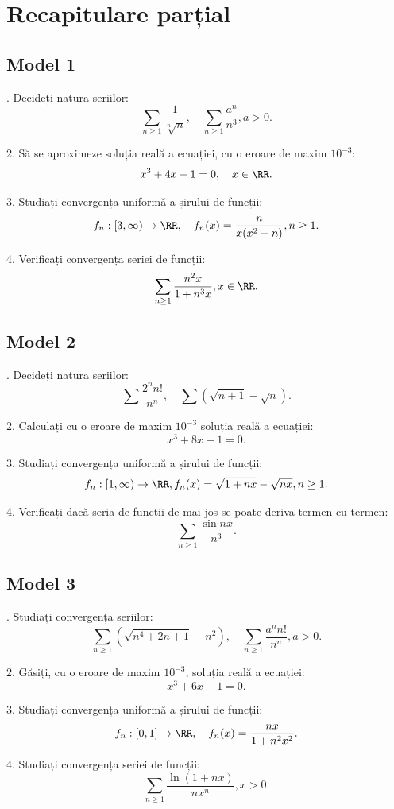 \chapter{Recapitulare parțial}


\section{Model 1}

\indent{}. Decideți natura seriilor:
\[
  \sum_{n \geq 1} \frac{1}{\sqrt[n]{n}}, \quad %
  \sum_{n \geq 1} \frac{a^n}{n^3}, a > 0.
\]

2. Să se aproximeze soluția reală a ecuației, cu o eroare de maxim $ 10^{-3} $:
\[
  x^3 + 4x - 1 = 0, \quad x \in \RR.
\]

3. Studiați convergența uniformă a șirului de funcții:
\[
  f_n : [3, \infty) \to \RR, \quad f_n(x) = \frac{n}{x(x^2 + n)}, n \geq 1.
\]

4. Verificați convergența seriei de funcții:
\[
  \sum_{n \geq 1} \dfrac{n^2 x}{1 + n^3 x}, x \in \RR.
\]


\section{Model 2}

\indent{}. Decideți natura seriilor:
\[
  \sum \dfrac{2^n n!}{n^n}, \quad \sum (\sqrt{n+1} - \sqrt{n}).
\]

2. Calculați cu o eroare de maxim $ 10^{-3} $ soluția reală a ecuației:
\[
  x^3 + 8x - 1 = 0.
\]

3. Studiați convergența uniformă a șirului de funcții:
\[
  f_n : [1, \infty) \to \RR, f_n(x) = \sqrt{1 + nx} - \sqrt{nx}, n \geq 1.
\]

4. Verificați dacă seria de funcții de mai jos se poate deriva termen cu termen:
\[
  \sum_{n \geq 1} \dfrac{\sin nx}{n^3}.
\]


\section{Model 3}

\indent{}. Studiați convergența seriilor:
\[
  \sum_{n \geq 1} (\sqrt{n^4 + 2n + 1} - n^2), \quad
  \sum_{n \geq 1} \frac{a^n n!}{n^n}, a > 0.
\]

2. Găsiți, cu o eroare de maxim $ 10^{-3} $, soluția reală a ecuației:
\[
  x^3 + 6x - 1 = 0.
\]

3. Studiați convergența uniformă a șirului de funcții:
\[
  f_n : [0, 1] \to \RR, \quad f_n(x) = \dfrac{nx}{1 + n^2 x^2}.
\]

4. Studiați convergența seriei de funcții:
\[
  \sum_{n \geq 1} \frac{\ln(1 + nx)}{nx^n}, x > 0.
\]

